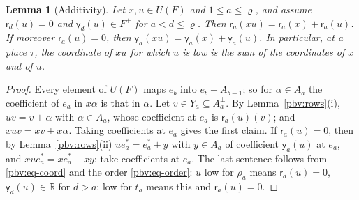 \documentclass[10pt]{amsart}
\newtheorem{lemma}[theorem]{Lemma}
\theoremstyle{definition}
\theoremstyle{remark}
\newcommand{\R}{\mathbb R}
\begin{document}
\begin{lemma}[Additivity]\label{pbv:add}
Let $x,u\in U(F)$ and $1\le a\le\varrho$, and assume $\mathsf r_d(u)=0$ and $\mathsf y_d(u)\in F^+$ for
$a<d\le\varrho$. Then $\mathsf r_a(xu)=\mathsf r_a(x)+\mathsf r_a(u)$. If moreover $\mathsf r_a(u)=0$, then
$\mathsf y_a(xu)=\mathsf y_a(x)+\mathsf y_a(u)$. In particular, at a place $\tau$, the coordinate of
$xu$ for which $u$ is low is the sum of the coordinates of $x$ and of $u$.
\end{lemma}
\begin{proof}
Every element of $U(F)$ maps $e_b$ into $e_b+A_{b-1}$; so for $\alpha\in A_a$ the coefficient of $e_a$ in
$x\alpha$ is that in $\alpha$. Let $v\in Y_a\subseteq A_a^\perp$. By Lemma~\ref{pbv:rows}(i), $uv=v+\alpha$ with
$\alpha\in A_a$, whose coefficient at $e_a$ is $\mathsf r_a(u)(v)$; and $xuv=xv+x\alpha$. Taking
coefficients at $e_a$ gives the first claim. If $\mathsf r_a(u)=0$, then by Lemma~\ref{pbv:rows}(ii)
$ue_a^*=e_a^*+y$ with $y\in A_a$ of coefficient $\mathsf y_a(u)$ at $e_a$, and $xue_a^*=xe_a^*+xy$; take
coefficients at $e_a$. The last sentence follows from \eqref{pbv:eq-coord} and the order
\eqref{pbv:eq-order}: $u$ low for $\rho_a$ means $\mathsf r_d(u)=0$, $\mathsf y_d(u)\in\R$ for $d>a$;
low for $t_a$ means this and $\mathsf r_a(u)=0$.
\end{proof}
\end{document}
